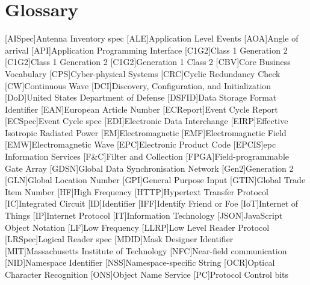 \chapter{Glossary}

\footnotesize
\SingleSpacing

\begin{multicols}{2}
\begin{acronym}[AAAAAA]
	[AISpec]{Antenna Inventory \acs{spec}}
	[ALE]{Application Level Events}
	[AOA]{Angle of arrival}
	[API]{Application Programming Interface}
	[C1G2]{Class 1 Generation 2}
	[C1G2]{Class 1 Generation 2}
	[C1G2]{Generation 1 Class 2}
	[CBV]{Core Business Vocabulary}
	[CPS]{Cyber-physical Systems}
	[CRC]{Cyclic Redundancy Check}
	[CW]{Continuous Wave}
	[DCI]{Discovery, Configuration, and Initialization}
	[DoD]{United States Department of Defense}
	[DSFID]{Data Storage Format Identifier}
	[EAN]{European Article Number}
	[ECReport]{Event Cycle Report}
	[ECSpec]{Event Cycle \ac{spec}}
	[EDI]{Electronic Data Interchange}
	[EIRP]{Effective Isotropic Radiated Power}
	[EM]{Electromagnetic}
	[EMF]{Electromagnetic Field}
	[EMW]{Electromagnetic Wave}
	[EPC]{Electronic Product Code}
	[EPCIS]{\ac{epc} Information Services}
	[F\&C]{Filter and Collection}
	[FPGA]{Field-programmable Gate Array}
	[GDSN]{Global Data Synchronisation Network}
	[Gen2]{Generation 2}
	[GLN]{Global Location Number}
	[GPI]{General Purpose Input}
	[GTIN]{Global Trade Item Number}
	[HF]{High Frequency}
	[HTTP]{Hypertext Transfer Protocol}
	[IC]{Integrated Circuit}
	[ID]{Identifier}
	[IFF]{Identify Friend or Foe}
	[IoT]{Internet of Things}
	[IP]{Internet Protocol}
	[IT]{Information Technology}
	[JSON]{JavaScript Object Notation}
	[LF]{Low Frequency}
	[LLRP]{Low Level Reader Protocol}
	[LRSpec]{Logical Reader \ac{spec}}
	[MDID]{Mask Designer Identifier}
	[MIT]{Massachusetts Institute of Technology}
	[NFC]{Near-field communication}
	[NID]{Namespace Identifier}
	[NSS]{Namespace-specific String}
	[OCR]{Optical Character Recognition}
	[ONS]{Object Name Service}
	[PC]{Protocol Control bits}

\end{acronym}
\end{multicols}
